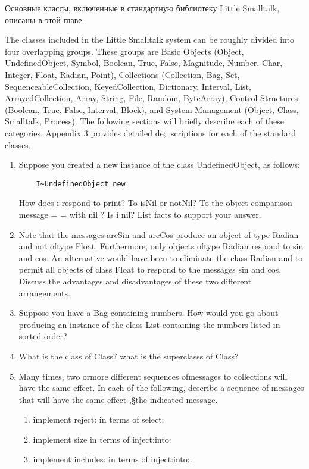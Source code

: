 \secdown

Основные классы, включенные в стандартную библиотеку Little Smalltalk, описаны в этой главе.

\bigskip

The classes included in the Little Smalltalk system can be roughly divided
into four overlapping groups. These groups are Basic Objects (Object,
UndefinedObject, Symbol, Boolean, True, False, Magnitude, Number,
Char, Integer, Float, Radian, Point), Collections (Collection, Bag, Set,
SequenceableCollection, KeyedCollection, Dictionary, Interval, List,
ArrayedCollection, Array, String, File, Random, ByteArray), Control
Structures (Boolean, True, False, Interval, Block), and System Management (Object, Class, Smalltalk, Process). The following sections will
briefly describe each of these categories. Appendix 3 provides detailed de;.
scriptions for each of the standard classes.








\begin{enumerate}

\item Suppose you created a new instance of the class UndefinedObject, as
follows:
\begin{lstlisting}
    I~UndefinedObject new
\end{lstlisting}
How does i respond to print? To isNil or notNil? To the object comparison message = = with nil ? Is i nil? List facts to support your
answer.

\item Note that the messages arcSin and arcCos produce an object of type
Radian and not oftype Float. Furthermore, only objects oftype Radian
respond to sin and cos. An alternative would have been to eliminate
the class Radian and to permit all objects of class Float to respond
to the messages sin and cos. Discuss the advantages and disadvantages
of these two different arrangements.

\item Suppose you have a Bag containing numbers. How would you go about
producing an instance of the class List containing the numbers listed
in sorted order?

\item What is the class of Class? what is the superclasss of Class?

\item Many times, two ormore different sequences ofmessages to collections
will have the same effect. In each of the following, describe a sequence
of messages that will have the same effect ,\S the indicated message.
\begin{enumerate}
    \item implement reject: in terms of select:
    \item implement size in terms of inject:into:
    \item implement includes: in terms of inject:into:.
\end{enumerate}

\end{enumerate}

\secup
